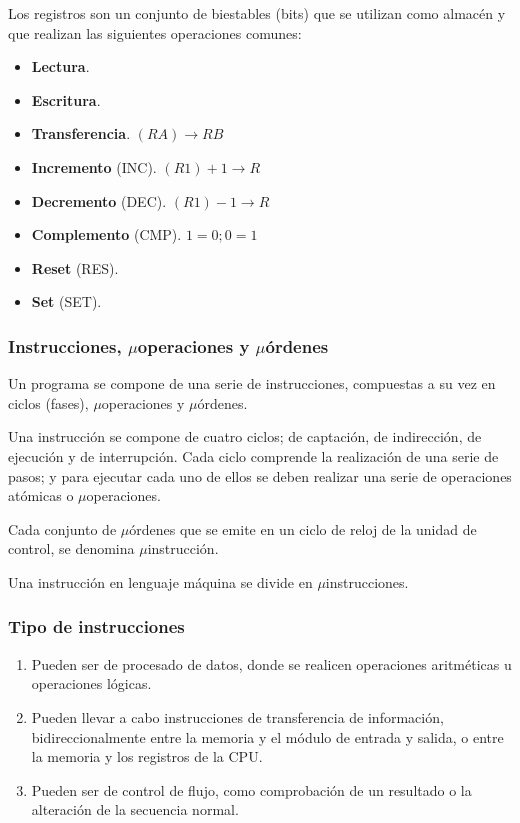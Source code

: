 \documentclass[a4paper, 11pt, titlepage]{article}
\begin{document}
            Los registros son un conjunto de biestables (bits) que se utilizan como almacén y que realizan las
            siguientes operaciones comunes:

            \begin{itemize}
                \item \textbf{Lectura}.
                \item \textbf{Escritura}.
                \item \textbf{Transferencia}. $(RA)\rightarrow RB$
                \item \textbf{Incremento} (INC). $(R1) + 1 \rightarrow R$
                \item \textbf{Decremento} (DEC). $(R1)-1 \rightarrow R$
                \item \textbf{Complemento} (CMP). $1 = 0; 0=1$
                \item \textbf{Reset} (RES).
                \item \textbf{Set} (SET).
            \end{itemize}

        \subsubsection{Instrucciones, $\mu$operaciones y $\mu$órdenes}

            Un programa se compone de una serie de instrucciones, compuestas a su vez en ciclos (fases),
            $\mu$operaciones y $\mu$órdenes.

            Una instrucción se compone de cuatro ciclos; de captación, de indirección, de ejecución y 
            de interrupción. Cada ciclo comprende la realización de una serie de pasos; y para ejecutar 
            cada uno de ellos se deben realizar una serie de operaciones atómicas o $\mu$operaciones.

            Cada conjunto de $\mu$órdenes que se emite en un ciclo de reloj de la unidad de control, se 
            denomina $\mu$instrucción.

            Una instrucción en lenguaje máquina se divide en $\mu$instrucciones.

        \subsubsection{Tipo de instrucciones}

            \begin{enumerate}
                \item Pueden ser de procesado de datos, donde se realicen operaciones aritméticas u operaciones 
                lógicas.
                \item Pueden llevar a cabo instrucciones de transferencia de información, bidireccionalmente 
                entre la memoria y el módulo de entrada y salida, o entre la memoria y los registros de la CPU.
                \item Pueden ser de control de flujo, como comprobación de un resultado o la alteración de la secuencia 
                normal.
            \end{enumerate}
\end{document}
